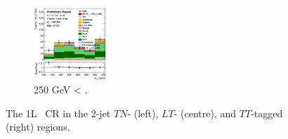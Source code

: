 \begin{figure}[h!]
\begin{subfigure}[b]{\textwidth}
        \includegraphics[width=0.32\textwidth]{Images/VH/Own_fit/postfit_VHcc/Region_distmBB_BMin250_DCRHigh_J2_TTypett_T2_L1_Y6051_GlobalFit_conditionnal_mu1.png}
        \caption{250 GeV < \ptv.}
        \label{fig:plots_VHcc_1L_250_CRH_2J}
    \end{subfigure}
    \caption{The 1L \highdr\ CR in the 2-jet $TN$- (left), $LT$- (centre), and $TT$-tagged (right) regions.}
    \label{fig:plots_VHcc_1L_CRH_2J}
\end{figure}

\vspace*{\fill} \newpage
\vspace*{\fill} 

